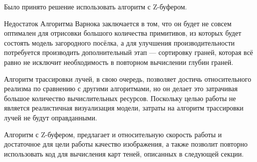 Было принято решение использовать алгоритм с Z-буфером. 

Недостаток Алгоритма Варнока заключается в том, что он будет не совсем оптимален для отрисовки большого количества примитивов, из которых будет состоять модель загородного посёлка, а для улучшения производительности потребуется производить дополнительный этап --- сортировку граней, которая всё равно не исключит необходимость в повторном вычислении глубин граней.

Алгоритм трассировки лучей, в свою очередь, позволяет достичь относительного реализма по сравнению с другими алгоритмами, но он делает это затрачивая большое количество вычислительных ресурсов. Поскольку целью работы не является реалистичная визуализация модели, затраты на алгоритм трассировки лучей не будут оправданными.

Алгоритм с Z-буфером, предлагает и относительную скорость работы и достаточное для цели работы качество изображения, а также позволит повторно использовать код для вычисления карт теней, описанных в следующей секции.